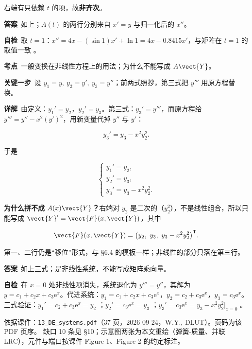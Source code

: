 \documentclass[11pt]{ctexart}
\renewcommand{\qbreak}{\needspace{0.26\textheight}}
\newcommand{\qpagebreak}{\needspace{0.92\textheight}}
\begin{document}
右端有只依赖 $t$ 的项，故\textbf{非齐次}。

\textbf{答案}\ 如上；$A(t)$ 的两行分别来自 $x'=y$ 与归一化后的 $x''$。

\textbf{自检}\ 取 $t=1$：$x''=4x-(\sin1)x'+\ln1=4x-0.8415x'$，与矩阵在 $t=1$ 的取值一致 。

\qpagebreak
{}
\label{c1:app:a8}

\qbreak
{}

\textbf{考点}\ 一般变换在非线性方程上的用法；为什么不能写成 $A\vect{Y}$。

\textbf{关键一步}\ 设 $y_1=y,\ y_2=y',\ y_3=y''$；前两式照抄，第三式把 $y'''$ 用原方程替换。

\textbf{详解}\ 由定义：$y_1'=y_2$，$y_2'=y_3$。第三式：$y_3'=y'''$，而原方程给 $y'''=y''-x^2(y')^2$，用新变量代掉 $y''$ 与 $y'$：

\[
y_3'=y_3-x^2y_2^2 .
\]

于是

\[
\begin{cases}
y_1'=y_2,\\[3pt]
y_2'=y_3,\\[3pt]
y_3'=y_3-x^2y_2^2 .
\end{cases}
\]

\textbf{为什么拼不成 $A(x)\vect{Y}$？}右端对 $y_2$ 是二次的（$y_2^2$），不是线性组合，所以只能写成 $\vect{Y}'=\vect{F}(x,\vect{Y})$，其中

\[
\vect{F}(x,\vect{Y})=\bigl(y_2,\ y_3,\ y_3-x^2y_2^2\bigr)^{\mathsf T}.
\]

第一、二行仍是“移位”形式，与 §6.4 的模板一样；非线性的部分只落在第三行。

\textbf{答案}\ 如上三式；是非线性系统，不能写成矩阵乘向量。

\textbf{自检}\ 在 $x=0$ 处非线性项消失，系统退化为 $y'''=y''$，其解为 $y=c_1+c_2x+c_3\mathrm{e}^{x}$。代进系统：$y_1=c_1+c_2x+c_3\mathrm{e}^x$，$y_2=c_2+c_3\mathrm{e}^x$，$y_3=c_3\mathrm{e}^x$。三式验证：$y_1'=c_2+c_3\mathrm{e}^x=y_2$ ；$y_2'=c_3\mathrm{e}^x=y_3$ ；$y_3'=c_3\mathrm{e}^x=y_3-x^2y_2^2\big|_{x=0}$ 。

\flowerrule

{\small\color{inkgray}
依据课件：\texttt{13\_DE\_systems.pdf}（37 页，2026-09-24，W.Y., DLUT）。页码为该 PDF 页序。
缺口 10 条见 §10；示意图两张为本文重绘（弹簧-质量、并联 LRC），元件与端口按课件 Figure 1、Figure 2 的约定标注。}
\end{document}
